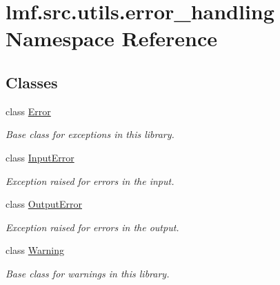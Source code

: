 \hypertarget{namespacelmf_1_1src_1_1utils_1_1error__handling}{\section{lmf.\+src.\+utils.\+error\+\_\+handling Namespace Reference}
\label{namespacelmf_1_1src_1_1utils_1_1error__handling}
}
\subsection*{Classes}
\begin{DoxyCompactItemize}
\item 
class \hyperlink{classlmf_1_1src_1_1utils_1_1error__handling_1_1_error}{Error}
\begin{DoxyCompactList}\small\item\em Base class for exceptions in this library. \end{DoxyCompactList}\item 
class \hyperlink{classlmf_1_1src_1_1utils_1_1error__handling_1_1_input_error}{Input\+Error}
\begin{DoxyCompactList}\small\item\em Exception raised for errors in the input. \end{DoxyCompactList}\item 
class \hyperlink{classlmf_1_1src_1_1utils_1_1error__handling_1_1_output_error}{Output\+Error}
\begin{DoxyCompactList}\small\item\em Exception raised for errors in the output. \end{DoxyCompactList}\item 
class \hyperlink{classlmf_1_1src_1_1utils_1_1error__handling_1_1_warning}{Warning}
\begin{DoxyCompactList}\small\item\em Base class for warnings in this library. \end{DoxyCompactList}\end{DoxyCompactItemize}
